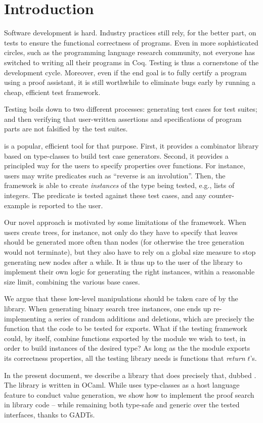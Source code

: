 \section{Introduction}
\label{sec:introduction}

Software development is hard. Industry practices still rely, for the better
part, on tests to ensure the functional correctness of programs. Even in more
sophisticated circles, such as the programming language research community, not
everyone has switched to writing all their programs in Coq. Testing is thus a
cornerstone of the development cycle. Moreover, even if the end goal is to fully
certify a program using a proof assistant, it is still worthwhile to eliminate
bugs early by running a cheap, efficient test framework.


Testing boils down to two different processes: generating test cases
for test suites; and then verifying that user-written assertions and
specifications of program parts are not falsified by the test suites.

\qcheck{} is a popular, efficient tool for that purpose. First, it
provides a combinator library based on type-classes to build test case
generators. Second, it provides a principled way for the users to
specify properties over functions. For instance, users may write
predicates such as ``reverse is an involution''. Then, the \qcheck
framework is able to create \emph{instances} of the type being tested,
e.g., lists of integers.  The predicate is tested against these test
cases, and any counter-example is reported to the user.

Our novel approach is motivated by some limitations of the \qcheck
framework.  When users create trees, for instance, not only do they
have to specify that leaves should be generated more often than nodes
(for otherwise the tree generation would not terminate), but they also
have to rely on a global size measure to stop generating new nodes
after a while. It is thus up to the user of the library to implement
their own logic for generating the right instances, within a
reasonable size limit, combining the various base cases.

We argue that these low-level manipulations should be taken care of by the
library. When generating binary search tree instances, one ends up
re-implementing a series of random additions and deletions, which are precisely
the function that the code to be tested for exports. What if the testing
framework could, by itself, combine functions exported by the module we wish to
test, in order to build instances of the desired type? As long as the the module
exports its correctness properties, all the testing library needs is functions
that \emph{return} $t$'s.

In the present document, we describe a library that does precisely
that, dubbed \arti. The library is written in OCaml. While \qcheck
uses type-classes as a host language feature to conduct value
generation, we show how to implement the proof search in library
code -- while remaining both type-safe and generic over the
tested interfaces, thanks to GADTs.
